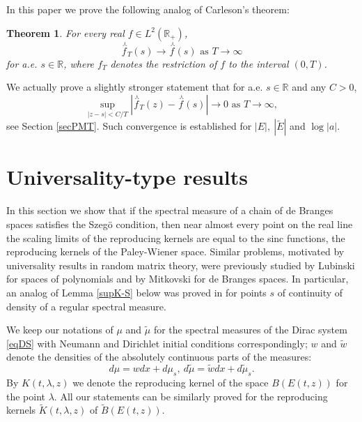 \documentclass[11pt,twoside,reqno]{amsart}
\def\ti{\tilde}
\def\to{\rightarrow}
\def \nlhat {\overset{\ \curlywedge}}
\def\R{{\mathbb R}}
\def\l{\lambda}
\theoremstyle{plain}
\newtheorem{lemma}{Lemma}
\newtheorem{theorem}{Theorem}
\numberwithin{equation}{section}
\begin{document}
%
%
%
%
%
%
%


In this paper we prove the following analog of Carleson's theorem:

\begin{theorem}\label{main} For every real $f\in L^2(\R_+)$,
$$\overset{\ \curlywedge}f_T(s)\to \overset{\ \curlywedge}f(s)\textrm{ as }T\to\infty$$
 for a.e. $s\in\R$, where $f_T$ denotes the restriction of  $f$ to the interval $(0,T)$.
\end{theorem}

We actually prove a slightly stronger statement that for a.e. $s\in \R$ and any $C>0$,
$$\sup_{|z-s|<C/T}|\nlhat f_T(z)-\nlhat f(s)|\to 0\textrm{ as }T\to\infty,$$
see Section \ref{secPMT}.
Such convergence is established for $|E|,\ |\ti E|$ and $\log |a|$.

\section{Universality-type results}\label{secUR}

In this section we show that if the spectral measure of a chain of de Branges spaces satisfies
the Szeg\"o condition, then near almost every point on the real line the scaling limits of the reproducing kernels
are equal to the sinc functions, the reproducing kernels of the Paley-Wiener space. Similar problems, motivated by universality results in random matrix theory, were previously studied
by Lubinski \cite{L} for spaces of polynomials and by Mitkovski \cite{M} for de Branges spaces.
In particular, an analog of Lemma \ref{supK-S} below was proved in \cite{M} for points $s$ of continuity
of density of a regular spectral measure.



We keep our notations of $\mu$ and $\ti\mu$ for the spectral measures of the Dirac system \eqref{eqDS}
with Neumann and Dirichlet initial conditions correspondingly; $w$ and $\ti w$ denote the densities
of the absolutely continuous parts of the measures:
$$d\mu=wdx+d\mu_{s},\ d\ti\mu=\ti wdx+d\ti\mu_{s}.$$
By $K(t,\l, z)$ we denote the reproducing kernel of the space $B(E(t,z))$
for the point $\l$. All our statements can be similarly proved for the reproducing kernels $\ti K(t,\l, z)$
of $\ti B(E(t,z))$.
\end{document}

